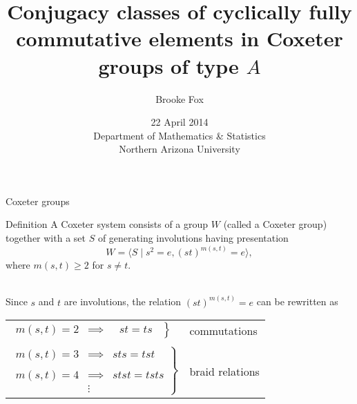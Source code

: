 \documentclass[9pt]{beamer}
\title[]{Conjugacy classes of cyclically fully commutative elements in Coxeter groups of type $A$}
\author[]{Brooke Fox}
\date{
  22 April 2014 \\ 
  Department of Mathematics \& Statistics \\
  Northern Arizona University}
\newcommand{\gen}[1]{\langle #1 \rangle}
\begin{document}
\begin{frame} \maketitle \end{frame}
%    

\begin{frame}{Coxeter groups}
%
\begin{block}{Definition} A \alert{Coxeter system} consists of a group $W$ (called a \alert{Coxeter group}) together with a set $S$ of generating involutions having presentation
    $$W= \gen{S \mid s^2=e,(st)^{m(s,t)}=e},$$
where $m(s,t)\geq 2$ for $s \neq t$.
\end{block} ~\\
    \pause
Since $s$ and $t$ are involutions, the relation $(st)^{m(s,t)}=e$ can be rewritten as
\begin{center}
\begin{tabular}{ll}
$\left.\begin{array}{lcc}m(s,t)=2 & \implies &\ \ \, st=ts\ \
\end{array} \right\}$ & \alert{commutations}\\ \\
$\left.\begin{array}{lcc}m(s,t)=3 & \implies & sts=tst \\ & & \\ m(s,t)=4 & \implies & stst=tsts \\ & \vdots & \end{array} \right\}$ & \alert{braid relations}
\end{tabular}
\end{center}
\end{frame}
\end{document}
